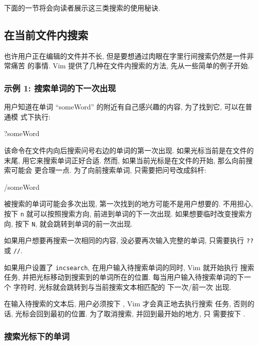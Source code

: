 下面的一节将会向读者展示这三类搜索的使用秘诀.

\subsection{在当前文件内搜索}
\label{subsec:search_the_current_file}

也许用户正在编辑的文件并不长, 但是要想通过肉眼在字里行间搜索仍然是一件非常痛苦
的事情. Vim 提供了几种在文件内搜索的方法, 先从一些简单的例子开始.

\subsubsection{示例 1: 搜索单词的下一次出现}
\label{subsubsec:example_1_find_the_next_occurrence_of_a_word}

用户知道在单词 ``someWord'' 的附近有自己感兴趣的内容, 为了找到它, 可以在普通模
式下执行:
\begin{vimcode}
?someWord
\end{vimcode}
该命令在文件内向后搜索问号右边的单词的第一次出现. 如果光标当前是在文件的末尾,
用它来搜索单词正好合适. 然而, 如果当前光标是在文件的开始, 那么向前搜索可能会
更合理一点. 为了向前搜索单词, 只需要把问号改成斜杆:
\begin{vimcode}
/someWord
\end{vimcode}
被搜索的单词可能会多次出现, 第一次找到的地方可能不是用户想要的. 不用担心, 按下
\texttt{n} 就可以按照搜索方向, 前进到单词的下一次出现. 如果想要临时改变搜索方向,
按下 \texttt{N}, 就会跳转到单词的前一次出现.

如果用户想要再搜索一次相同的内容, 没必要再次输入完整的单词, 只需要执行
\texttt{??} 或 \texttt{//}.

如果用户设置了 \texttt{incsearch}, 在用户输入待搜索单词的同时, Vim 就开始执行
搜索任务, 并把光标移动到搜索到的单词所在的位置. 每当用户输入待搜索单词的下一个
字符时, 光标就会跳转到与当前搜索文本相匹配的 下一次/前一次 出现.

\begin{warning}
    在输入待搜索的文本后, 用户必须按下 , Vim 才会真正地去执行搜索
    任务, 否则的话, 光标会回到最初的位置. 为了取消搜索, 并回到最开始的地方, 只
    需要按下 .
\end{warning}

\subsubsection{搜索光标下的单词}
\label{subsubsec:search_for_a_word_under_the_cursor}

